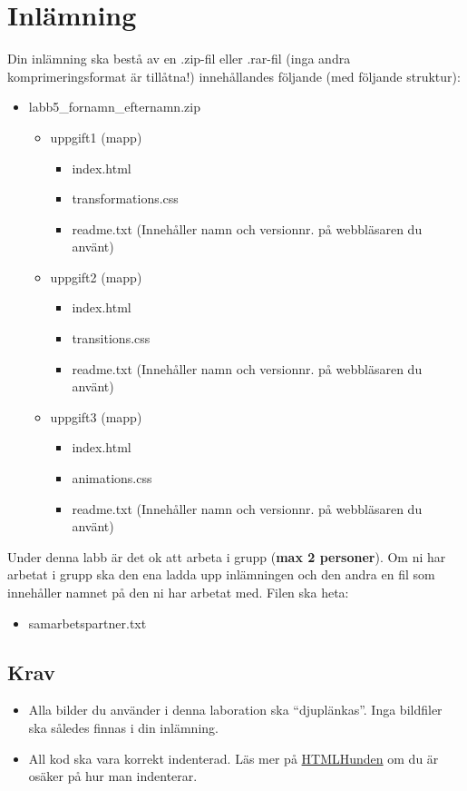 \documentclass[12pt]{article}
\begin{document}
\section{Inlämning}
Din inlämning ska bestå av en .zip-fil eller .rar-fil (inga andra komprimeringsformat är tillåtna!) innehållandes följande (med följande struktur):
  \begin{itemize}
    \item labb5\_fornamn\_efternamn.zip
      \vspace{-0.5em}
      \begin{itemize}
        \item uppgift1 (mapp)
          \begin{itemize}
            \item index.html
            \item transformations.css
            \item readme.txt (Innehåller namn och versionnr. på webbläsaren du använt)
          \end{itemize}
        \item uppgift2 (mapp)
          \begin{itemize}
            \item index.html
            \item transitions.css
            \item readme.txt (Innehåller namn och versionnr. på webbläsaren du använt)
          \end{itemize}
        \item uppgift3 (mapp)
          \begin{itemize}
            \item index.html
            \item animations.css
            \item readme.txt (Innehåller namn och versionnr. på webbläsaren du använt)
          \end{itemize}
    \end{itemize}
  \end{itemize}
  Under denna labb är det ok att arbeta i grupp (\textbf{max 2 personer}). Om ni har arbetat i grupp ska den ena ladda upp inlämningen och den andra en fil som innehåller namnet på den ni har arbetat med. Filen ska heta:
  \begin{itemize}
    \item samarbetspartner.txt
  \end{itemize}

  \subsection{Krav}
  \begin{itemize}
    \item Alla bilder du använder i denna laboration ska ``djuplänkas''. Inga bildfiler ska således finnas i din inlämning.
    \item All kod ska vara korrekt indenterad. Läs mer på \href{http://htmlhunden.se}{HTMLHunden} om du är osäker på hur man indenterar.
  \end{itemize}
\end{document}
